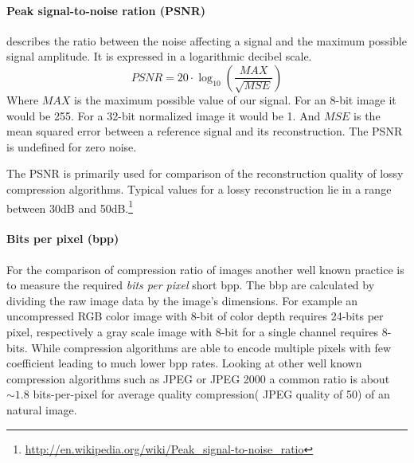 \paragraph{Peak signal-to-noise ration (PSNR)} describes the ratio between the
noise affecting a signal and the maximum possible signal amplitude. It is
expressed in a logarithmic decibel scale.
\begin{equation*}
 PSNR = 20 \cdot \log_{10} \left(\frac{MAX}{\sqrt{MSE}}\right)
\end{equation*}
Where $MAX$ is the maximum possible value of our signal. For an 8-bit
image it would be 255. For a 32-bit normalized image it would be 1. And $MSE$ is
the mean squared error between a reference signal and its reconstruction. The
PSNR is undefined for zero noise.

The PSNR is primarily used for comparison of the reconstruction quality of
lossy compression algorithms. Typical values for a lossy reconstruction lie in
a range between 30dB and
50dB.\footnote{\url{http://en.wikipedia.org/wiki/Peak_signal-to-noise_ratio}}

\paragraph{Bits per pixel (bpp)} 
For the comparison of compression ratio of images another well known practice is
to measure the required \emph{bits per pixel} short bpp. The bbp are calculated
by dividing the raw image data by the image's dimensions. For example an
uncompressed RGB color image with 8-bit of color depth requires 24-bits per
pixel, respectively a gray scale image with 8-bit for a single channel requires
8-bits. While compression algorithms are able to encode multiple pixels with few
coefficient leading to much lower bpp rates.
Looking at other well known compression algorithms such as JPEG or
JPEG 2000 a common ratio is about $\sim1.8$ bits-per-pixel for average
quality compression( JPEG quality of 50) of an natural image. 


